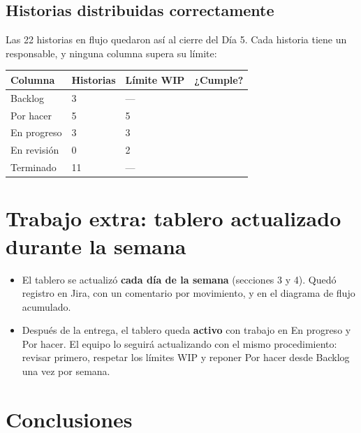 \documentclass[11pt,a4paper]{article}
\newcommand{\si}{\checkmark}
\begin{document}
\subsection{Historias distribuidas correctamente}

Las 22 historias en flujo quedaron así al cierre del Día 5. Cada historia tiene un responsable, y ninguna columna supera su límite:

\begin{center}
\small
\begin{tabular}{L{3cm} C{2cm} C{2.4cm} C{2cm}}
\toprule
\textbf{Columna} & \textbf{Historias} & \textbf{Límite WIP} & \textbf{¿Cumple?} \\
\midrule
Backlog & 3 & --- & \si \\
Por hacer & 5 & 5 & \si \\
En progreso & 3 & 3 & \si \\
En revisión & 0 & 2 & \si \\
Terminado & 11 & --- & \si \\
\bottomrule
\end{tabular}
\end{center}

\section{Trabajo extra: tablero actualizado durante la semana}

\begin{itemize}
  \item El tablero se actualizó \textbf{cada día de la semana} (secciones 3 y 4). Quedó registro en Jira, con un comentario por movimiento, y en el diagrama de flujo acumulado.
  \item Después de la entrega, el tablero queda \textbf{activo} con trabajo en En progreso y Por hacer. El equipo lo seguirá actualizando con el mismo procedimiento: revisar primero, respetar los límites WIP y reponer Por hacer desde Backlog una vez por semana.
\end{itemize}

\section{Conclusiones}
\end{document}
